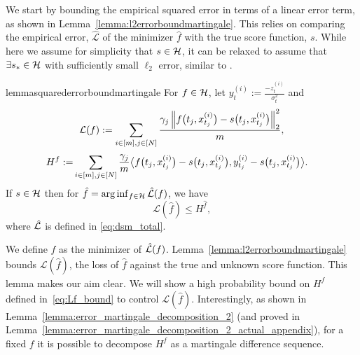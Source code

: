 
\bk

 We start by bounding the empirical squared error in terms of a linear error term, as shown in Lemma~\ref{lemma:l2errorboundmartingale}. This relies on comparing the empirical error, $\hat{\mathcal{L}}$ of the minimizer $\hat{f}$ with the true score function, $s$. While here we assume for simplicity that $s \in \mathcal{H}$, it can be relaxed to assume that $\exists s_{*}\in\mathcal{H}$ with sufficiently small $\ell_{2}$ error, similar to \cite{gupta2023sample}.

\begin{restatable}{lemma}{squarederrorboundmartingale}\label{lemma:l2errorboundmartingale}
For $f \in \mathcal{H}$, let $ y_t^{(i)} := \frac{-z_{t}^{(i)}}{\sigma_{t}^{2}}$ and
\begin{equation}
    \mathcal{L}(f) := \sum_{i \in [m], j \in [N]} \frac{\gamma_{j} \left\lVert f\bigl(t_j, x_{t_j}^{(i)}\bigr) - s\bigl(t_j, x_{t_j}^{(i)}\bigr)\right\rVert_{2}^{2}}{m}, \notag
\end{equation}
\begin{equation}
    \begin{aligned}
        H^{f} := &\sum_{i \in [m], j \in [N]} \frac{\gamma_{j}}{m} \bigl\langle f\bigl(t_{j}, x_{t_{j}}^{(i)}\bigr) - s\bigl(t_{j}, x_{t_{j}}^{(i)}\bigr), y_{t_{j}}^{(i)} - s\bigl(t_{j}, x_{t_{j}}^{(i)}\bigr) \bigr\rangle. \notag
    \end{aligned}
\end{equation}
If $s \in \mathcal{H}$ then for $\hat{f} = \arg\inf_{f \in \mathcal{H}} \hat{\mathcal{L}}(f)$, we have  
\small
\begin{equation}
    \mathcal{L}(\hat{f}) \leq  H^{\hat{f}}, \label{eq:Lf_bound}
\end{equation}
\normalsize
where $\hat{\mathcal{L}}$ is defined in \eqref{eq:dsm_total}.
\end{restatable}

We define $\hat{f}$ as the minimizer of $\hat{\mathcal{L}}(f)$.
Lemma~\ref{lemma:l2errorboundmartingale} bounds $\mathcal{L}(\hat{f})$, the loss of $\hat{f}$ against the true and unknown score function. This lemma makes our aim clear. We will show a high probability bound on $H^{\hat{f}}$ defined in~\eqref{eq:Lf_bound} to control $\mathcal{L}(\hat{f})$. Interestingly, as shown in Lemma~\ref{lemma:error_martingale_decomposition_2} (and proved in Lemma~\ref{lemma:error_martingale_decomposition_2_actual_appendix}), for a fixed $f$ it is possible to decompose $H^{f}$ as a martingale difference sequence. 

